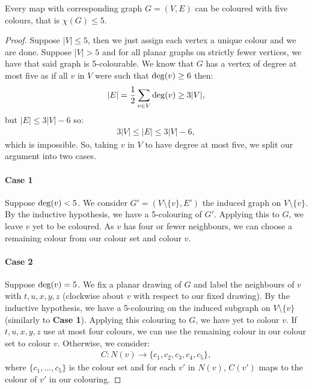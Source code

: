 Every map with corresponding graph $G = (V, E)$ can be coloured with five colours, 
that is $\chi(G) \leq 5$.
\begin{proof}
    Suppose $|V| \leq 5$, then we just assign each vertex a unique colour and 
    we are done.
    Suppose $|V| > 5$ and for all planar graphs on strictly fewer vertices, 
    we have that said graph is 5-colourable. We know that $G$ has a vertex
    of degree at most five as if all $v$ in $V$ were such that $\operatorname{deg}(v) \geq 6$
    then: \begin{gather*}
        |E| = \frac{1}{2}\sum_{v \in V} \operatorname{deg}(v) \geq 3|V|,
    \end{gather*} but $|E| \leq 3|V| - 6$ so: \begin{gather*}
        3|V| \leq |E| \leq 3|V| - 6,
    \end{gather*} which is impossible. So, taking $v$ in $V$ to have degree
    at most five, we split our argument into two cases.

    \paragraph{Case 1} Suppose $\operatorname{deg}(v) < 5$. We consider
    $G' = (V \setminus \{v\}, E')$ the induced graph on $V \setminus \{v\}$.
    By the inductive hypothesis, we have a 5-colouring of $G'$. Applying this
    to $G$, we leave $v$ yet to be coloured. As $v$ has four or fewer neighbours,
    we can choose a remaining colour from our colour set and colour $v$.
    
    \paragraph{Case 2} 
    Suppose $\operatorname{deg}(v) = 5$. We fix a planar drawing of $G$ and label 
    the neighbours of $v$ with $t, u, x, y, z$ (clockwise about $v$ with respect to
    our fixed drawing). By the inductive hypothesis, we have a 5-colouring on the
    induced subgraph on $V \setminus \{v\}$ (similarly to \textbf{Case 1}). Applying
    this colouring to $G$, we have yet to colour $v$. If $t, u, x, y, z$ use
    at most four colours, we can use the remaining colour in our colour set
    to colour $v$. Otherwise, we consider: \begin{gather*}
        C : N(v) \to \{c_1, c_2, c_3, c_4, c_5\},
    \end{gather*} where $\{c_1, \ldots, c_5\}$ is the colour set and
    for each $v'$ in $N(v)$, $C(v')$ maps to the colour of $v'$ in our
    colouring.


\end{proof}
